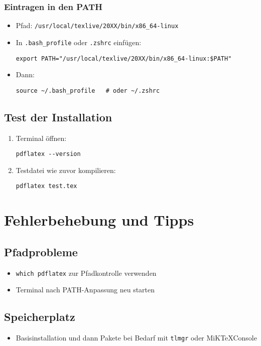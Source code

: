 \subsubsection{Eintragen in den PATH}
\begin{itemize}
    \item Pfad: \texttt{/usr/local/texlive/20XX/bin/x86\_64-linux}
    \item In \texttt{.bash\_profile} oder \texttt{.zshrc} einfügen:
    \begin{verbatim}
export PATH="/usr/local/texlive/20XX/bin/x86_64-linux:$PATH"
    \end{verbatim}
    \item Dann:
    \begin{verbatim}
source ~/.bash_profile   # oder ~/.zshrc
    \end{verbatim}
\end{itemize}

\subsection{Test der Installation}
\begin{enumerate}
    \item Terminal öffnen:
    \begin{verbatim}
pdflatex --version
    \end{verbatim}
    \item Testdatei wie zuvor kompilieren:
    \begin{verbatim}
pdflatex test.tex
    \end{verbatim}
\end{enumerate}

\section{Fehlerbehebung und Tipps}
\subsection{Pfadprobleme}
\begin{itemize}
    \item \texttt{which pdflatex} zur Pfadkontrolle verwenden
    \item Terminal nach PATH-Anpassung neu starten
\end{itemize}

\subsection{Speicherplatz}
\begin{itemize}
    \item Basisinstallation und dann Pakete bei Bedarf mit \texttt{tlmgr} oder MiK\TeX Console
\end{itemize}
